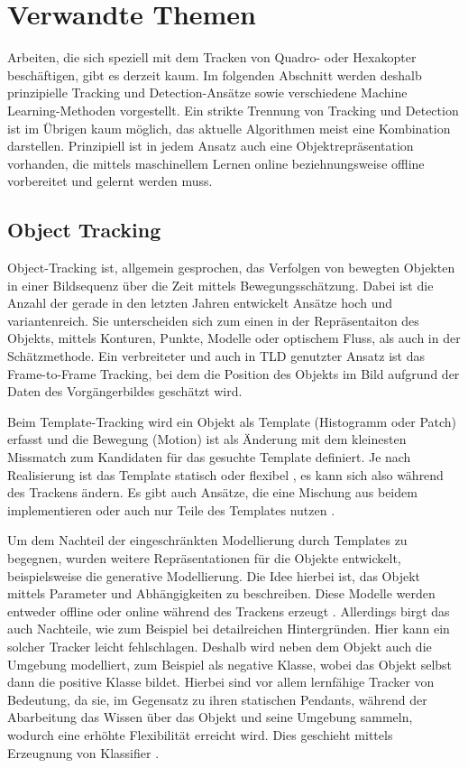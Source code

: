 \section {Verwandte Themen }
Arbeiten, die sich speziell mit dem Tracken von Quadro- oder Hexakopter beschäftigen, gibt es derzeit kaum. Im folgenden Abschnitt werden deshalb prinzipielle Tracking und Detection-Ansätze sowie verschiedene Machine Learning-Methoden vorgestellt. Ein strikte Trennung von Tracking und Detection ist im Übrigen kaum möglich, das aktuelle Algorithmen meist eine Kombination darstellen. Prinzipiell ist in jedem Ansatz auch eine Objektrepräsentation vorhanden, die mittels maschinellem Lernen online beziehnungsweise offline vorbereitet und gelernt werden muss.

\subsection{Object Tracking}
Object-Tracking ist, allgemein gesprochen, das Verfolgen von bewegten Objekten in einer Bildsequenz über die Zeit mittels Bewegungsschätzung. Dabei ist die Anzahl der gerade in den letzten Jahren entwickelt Ansätze hoch und variantenreich. Sie unterscheiden sich zum einen in der Repräsentaiton des Objekts, mittels Konturen, Punkte, Modelle oder optischem Fluss, als auch in der Schätzmethode. Ein verbreiteter und auch in TLD genutzter Ansatz ist das Frame-to-Frame Tracking, bei dem die Position des Objekts im Bild aufgrund der Daten des Vorgängerbildes geschätzt wird.

Beim Template-Tracking \cite{OPT}\cite{GFT}\cite{KBT} wird ein Objekt als Template (Histogramm oder Patch) erfasst und die Bewegung (Motion) ist als Änderung mit dem kleinesten Missmatch zum Kandidaten für das gesuchte Template definiert. Je nach Realisierung ist das Template statisch\cite{KBT} oder flexibel \cite{OPT}\cite{GFT}, es kann sich also während des Trackens ändern. Es gibt auch Ansätze, die eine Mischung aus beidem implementieren \cite{TUP}\cite{SMAT}\cite{RDT} oder auch nur Teile des Templates nutzen \cite{ROAM}\cite{RFT}.

Um dem Nachteil der eingeschränkten Modellierung durch Templates zu begegnen, wurden weitere Repräsentationen für die Objekte entwickelt, beispielsweise die generative Modellierung. Die Idee hierbei ist, das Objekt mittels Parameter und Abhängigkeiten zu beschreiben. Diese Modelle werden entweder offline \cite{ETR} oder online während des Trackens erzeugt \cite{RFT}\cite{VTD}. Allerdings birgt das auch Nachteile, wie zum Beispiel bei detailreichen Hintergründen. Hier kann ein solcher Tracker leicht fehlschlagen. Deshalb wird neben dem Objekt auch die Umgebung modelliert, zum Beispiel als negative Klasse, wobei das Objekt selbst dann die positive Klasse bildet. Hierbei sind vor allem lernfähige Tracker von Bedeutung, da sie, im Gegensatz zu ihren statischen Pendants, während der Abarbeitung das Wissen über das Objekt und seine Umgebung sammeln, wodurch eine erhöhte Flexibilität erreicht wird. Dies geschieht mittels Erzeugnung von Klassifier \cite{ONS}\cite{ENT}\cite{OBT}. 

